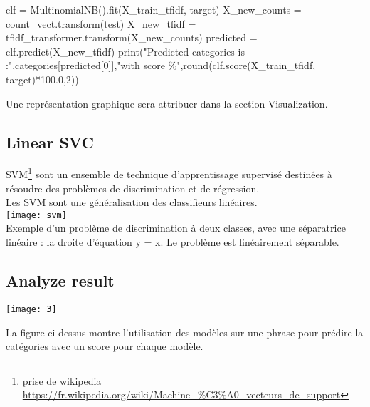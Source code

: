\documentclass[english,a4paper,11pt,oneside]{article}
\begin{document}
{{\begin{pythonn}
	clf = MultinomialNB().fit(X_train_tfidf, target)
	X_new_counts = count_vect.transform(test)
	X_new_tfidf = tfidf_transformer.transform(X_new_counts)
	predicted = clf.predict(X_new_tfidf)
	print("Predicted categories is :",categories[predicted[0]],"with score  \%",round(clf.score(X_train_tfidf, target)*100.0,2))

		\end{pythonn}
	
		Une représentation graphique sera attribuer dans la section Visualization.	
	}
	
	\subsection{Linear SVC}{
	SVM\footnote{prise de wikipedia \url{https://fr.wikipedia.org/wiki/Machine\_\%C3\%A0_vecteurs_de_support}} sont un ensemble de technique d'apprentissage supervisé destinées à résoudre des problèmes de discrimination et de régression.\\
	Les SVM sont une généralisation des classifieurs linéaires.\\
	\texttt{[image: svm]}\\
	Exemple d'un problème de discrimination à deux classes, avec une séparatrice linéaire : la droite d'équation y = x. Le problème est linéairement séparable.
	
		
	}
	\subsection{Analyze result}{
		\texttt{[image: 3]}
		
		La figure ci-dessus montre l'utilisation des modèles sur une phrase pour prédire la catégories avec un score pour chaque modèle.

	}
	}
\end{document}
